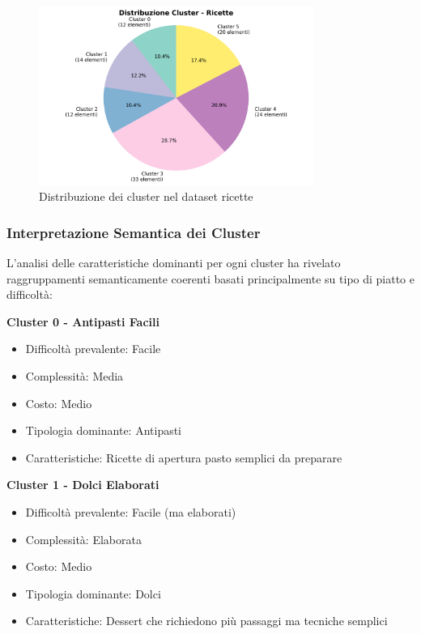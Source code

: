 \documentclass[12pt,a4paper]{article}
\begin{document}
\begin{figure}[H]
\centering
\includegraphics[width=0.8\textwidth]{dati/cluster_distribution_ricette.png}
\caption{Distribuzione dei cluster nel dataset ricette}
\label{fig:cluster_distribution}
\end{figure}

\subsubsection{Interpretazione Semantica dei Cluster}

L'analisi delle caratteristiche dominanti per ogni cluster ha rivelato raggruppamenti semanticamente coerenti basati principalmente su tipo di piatto e difficoltà:

\textbf{Cluster 0 - Antipasti Facili}
\begin{itemize}
    \item Difficoltà prevalente: Facile
    \item Complessità: Media
    \item Costo: Medio
    \item Tipologia dominante: Antipasti
    \item Caratteristiche: Ricette di apertura pasto semplici da preparare
\end{itemize}

\textbf{Cluster 1 - Dolci Elaborati}
\begin{itemize}
    \item Difficoltà prevalente: Facile (ma elaborati)
    \item Complessità: Elaborata
    \item Costo: Medio
    \item Tipologia dominante: Dolci
    \item Caratteristiche: Dessert che richiedono più passaggi ma tecniche semplici
\end{itemize}
\end{document}
